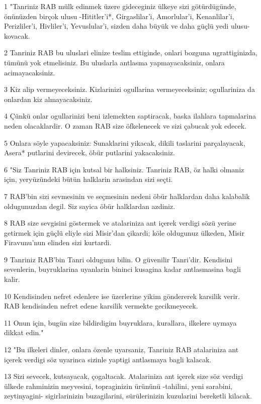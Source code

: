\par 1 "Tanriniz RAB mülk edinmek üzere gideceginiz ülkeye sizi götürdügünde, önünüzden birçok ulusu -Hititler'i*, Girgaslilar'i, Amorlular'i, Kenanlilar'i, Perizliler'i, Hivliler'i, Yevuslular'i, sizden daha büyük ve daha güçlü yedi ulusu- kovacak.
\par 2 Tanriniz RAB bu uluslari elinize teslim ettiginde, onlari bozguna ugrattiginizda, tümünü yok etmelisiniz. Bu uluslarla antlasma yapmayacaksiniz, onlara acimayacaksiniz.
\par 3 Kiz alip vermeyeceksiniz. Kizlarinizi ogullarina vermeyeceksiniz; ogullariniza da onlardan kiz almayacaksiniz.
\par 4 Çünkü onlar ogullarinizi beni izlemekten saptiracak, baska ilahlara tapmalarina neden olacaklardir. O zaman RAB size öfkelenecek ve sizi çabucak yok edecek.
\par 5 Onlara söyle yapacaksiniz: Sunaklarini yikacak, dikili taslarini parçalayacak, Asera* putlarini devirecek, öbür putlarini yakacaksiniz.
\par 6 "Siz Tanriniz RAB için kutsal bir halksiniz. Tanriniz RAB, öz halki olmaniz için, yeryüzündeki bütün halklarin arasindan sizi seçti.
\par 7 RAB'bin sizi sevmesinin ve seçmesinin nedeni öbür halklardan daha kalabalik oldugunuzdan degil. Siz sayica öbür halklardan azdiniz.
\par 8 RAB size sevgisini göstermek ve atalariniza ant içerek verdigi sözü yerine getirmek için güçlü eliyle sizi Misir'dan çikardi; köle oldugunuz ülkeden, Misir Firavunu'nun elinden sizi kurtardi.
\par 9 Tanriniz RAB'bin Tanri oldugunu bilin. O güvenilir Tanri'dir. Kendisini sevenlerin, buyruklarina uyanlarin bininci kusagina kadar antlasmasina bagli kalir.
\par 10 Kendisinden nefret edenlere ise üzerlerine yikim göndererek karsilik verir. RAB kendisinden nefret edene karsilik vermekte gecikmeyecek.
\par 11 Onun için, bugün size bildirdigim buyruklara, kurallara, ilkelere uymaya dikkat edin."
\par 12 "Bu ilkeleri dinler, onlara özenle uyarsaniz, Tanriniz RAB atalariniza ant içerek verdigi söz uyarinca sizinle yaptigi antlasmaya bagli kalacak.
\par 13 Sizi sevecek, kutsayacak, çogaltacak. Atalariniza ant içerek size söz verdigi ülkede rahminizin meyvesini, topraginizin ürününü -tahilini, yeni sarabini, zeytinyagini- sigirlarinizin buzagilarini, sürülerinizin kuzularini bereketli kilacak.
